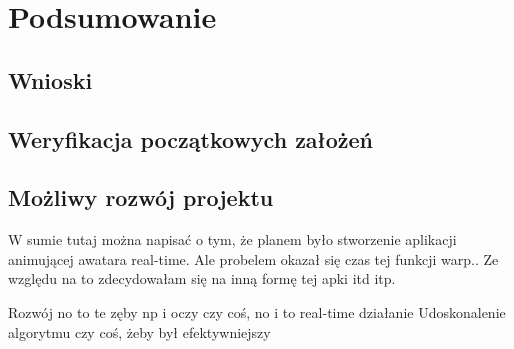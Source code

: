 \chapter{Podsumowanie}
\label{cha:podsumowanie}
\section{Wnioski}
\section{Weryfikacja początkowych założeń}
\section{Możliwy rozwój projektu}
W sumie tutaj można napisać o tym, że planem było stworzenie aplikacji animującej awatara real-time. Ale probelem okazał się czas tej funkcji warp.. Ze względu na to zdecydowałam się na inną formę tej apki itd itp.

Rozwój no to te zęby np i oczy czy coś, no i to real-time działanie
Udoskonalenie algorytmu czy coś, żeby był efektywniejszy

